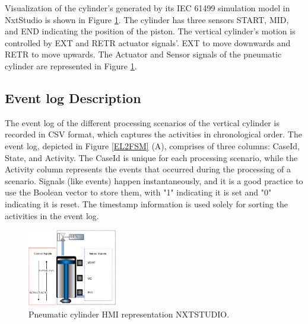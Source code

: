 \begin{bibunit}
Visualization of the cylinder's generated by its IEC 61499 simulation model in NxtStudio is shown in Figure \ref{VC_NXT_HMI}.  The cylinder has three sensors START, MID, and END indicating the position of the piston. The vertical cylinder's motion is controlled by EXT and RETR actuator signals'. EXT  to move downwards and RETR  to move upwards. The Actuator and Sensor signals of the pneumatic cylinder are represented in Figure \ref{VC_NXT_HMI}.





\subsection{Event log Description}


The event log of the different processing scenarios of the vertical cylinder is recorded in CSV format, which captures the activities in chronological order. The event log, depicted in Figure \ref{EL2FSM} (A), comprises of three columns: CaseId, State, and Activity. The CaseId is unique for each processing scenario, while the Activity column represents the events that occurred during the processing of a scenario. Signals (like events) happen instantaneously, and it is a good practice to use the Boolean vector to store them, with "1" indicating it is set and "0" indicating it is reset. The timestamp information is used solely for sorting the activities in the event log.



\begin{figure}[!t]
	\centering
	\includegraphics[width=0.35\textwidth]{MX_Papers/Paper7/images/CylinderHMI.png}
	\caption{Pneumatic cylinder HMI representation NXTSTUDIO.}
	\label{VC_NXT_HMI}
\end{figure}




\end{bibunit}
